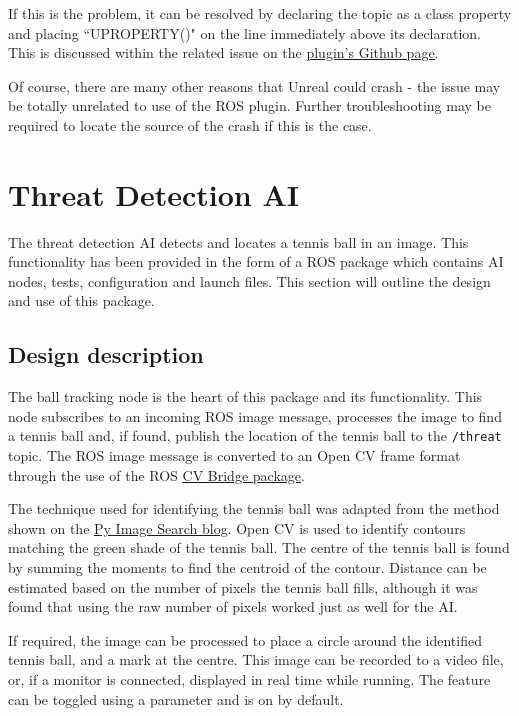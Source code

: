 \documentclass[../main.tex]{subfiles}
\begin{document}
If this is the problem, it can be resolved by declaring the topic as a class property and placing ``UPROPERTY()" on the line immediately above its declaration. This is discussed within the related issue on the \href{https://github.com/code-iai/ROSIntegration/issues/32}{\underline{plugin's Github page}}.

Of course, there are many other reasons that Unreal could crash - the issue may be totally unrelated to use of the ROS plugin. Further troubleshooting may be required to locate the source of the crash if this is the case.

\section{Threat Detection AI}
The threat detection AI detects and locates a tennis ball in an image. This functionality has been provided in the form of a ROS package which contains AI nodes, tests, configuration and launch files. This section will outline the design and use of this package.

\subsection{Design description}
The ball tracking node is the heart of this package and its functionality. This node subscribes to an incoming ROS image message, processes the image to find a tennis ball and, if found, publish the location of the tennis ball to the \texttt{/threat} topic. The ROS image message is converted to an Open CV frame format through the use of the ROS \href{http://wiki.ros.org/cv_bridge}{\underline{CV Bridge package}}.

The technique used for identifying the tennis ball was adapted from the method shown on the \href{https://www.pyimagesearch.com/2015/09/14/ball-tracking-with-opencv/}{\underline{Py Image Search blog}}. Open CV is used to identify contours matching the green shade of the tennis ball. The centre of the tennis ball is found by summing the moments to find the centroid of the contour. Distance can be estimated based on the number of pixels the tennis ball fills, although it was found that using the raw number of pixels worked just as well for the AI. 

If required, the image can be processed to place a circle around the identified tennis ball, and a mark at the centre. This image can be recorded to a video file, or, if a monitor is connected, displayed in real time while running. The feature can be toggled using a parameter and is on by default.
\end{document}
